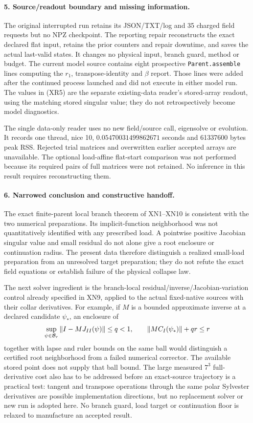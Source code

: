 \documentclass[11pt]{article}
\begin{document}
\paragraph{5. Source/readout boundary and missing information.}
The original interrupted run retains its JSON/TXT/log and
35 charged field requests but no NPZ checkpoint.
The reporting repair reconstructs the exact declared flat
input, retains the prior counters and repair downtime, and
saves the actual last-valid states.  It changes no physical
input, branch guard, method or budget.
The current model source contains eight prospective
\texttt{Parent.assemble} lines computing the $r_1$,
transpose-identity and $\beta$ report.  Those lines were
added after the continued process launched and did not
execute in either model run.
The values in (XR5) are the separate existing-data reader's
stored-array readout, using the matching stored singular value;
they do not retrospectively become model diagnostics.

The single data-only reader uses no new field/source call,
eigensolve or evolution.  It records one thread, nice 10,
$0.05470031499862671$ seconds and 61337600 bytes peak RSS.
Rejected trial matrices and overwritten earlier accepted
arrays are unavailable.  The optional load-affine
flat-start comparison was not performed because its
required pairs of full matrices were not retained.
No inference in this result requires reconstructing them.

\paragraph{6. Narrowed conclusion and constructive handoff.}
The exact finite-parent local branch theorem of XN1--XN10
is consistent with the two numerical preparations.
Its implicit-function neighborhood was not quantitatively
identified with any prescribed load.  A pointwise positive
Jacobian singular value and small residual do not alone
give a root enclosure or continuation radius.
The present data therefore distinguish a realized
small-load preparation from an unresolved target
preparation; they do not refute the exact field equations
or establish failure of the physical collapse law.

The next solver ingredient is the branch-local
residual/inverse/Jacobian-variation control already
specified in XN9, applied to the actual fixed-native
sources with their collar derivatives.
For example, if $M$ is a bounded approximate inverse at
a declared candidate $\psi_*$, an enclosure of
\[
 \sup_{\psi\in{\cal B}_r}
      \|I-MJ_{II}(\psi)\|\leq q<1,\qquad
 \|M C_I(\psi_*)\|+qr\leq r
\]
together with lapse and ruler bounds on the same ball
would distinguish a certified root neighborhood from a
failed numerical corrector.  The available stored point
does not supply that ball bound.  The large measured
$7^3$ full-derivative cost also has to be addressed before
an exact-source trajectory is a practical test: tangent
and transpose operations through the same polar Sylvester
derivatives are possible implementation directions, but
no replacement solver or new run is adopted here.
No branch guard, load target or continuation floor is
relaxed to manufacture an accepted result.
\end{document}
